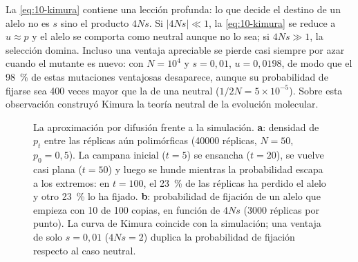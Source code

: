 La \cref{eq:10-kimura} contiene una lección profunda: lo que decide el destino de un alelo no es $s$ sino el producto $4Ns$. Si $|4Ns|\ll1$, la \cref{eq:10-kimura} se reduce a $u\approx p$ y el alelo se comporta como neutral aunque no lo sea; si $4Ns\gg1$, la selección domina. Incluso una ventaja apreciable se pierde casi siempre por azar cuando el mutante es nuevo: con $N=10^4$ y $s=0{,}01$, $u=0{,}0198$, de modo que el \SI{98}{\percent} de estas mutaciones ventajosas desaparece, aunque su probabilidad de fijarse sea 400 veces mayor que la de una neutral ($1/2N=5\times10^{-5}$). Sobre esta observación construyó Kimura la teoría neutral de la evolución molecular.

\begin{figure}[t]
\centering
{}
\caption[Difusión y fijación]{La aproximación por difusión frente a la simulación. \textbf{a}: densidad de $p_t$ entre las réplicas aún polimórficas (\num{40000} réplicas, $N=50$, $p_0=0{,}5$). La campana inicial ($t=5$) se ensancha ($t=20$), se vuelve casi plana ($t=50$) y luego se hunde mientras la probabilidad escapa a los extremos: en $t=100$, el \SI{23}{\percent} de las réplicas ha perdido el alelo y otro \SI{23}{\percent} lo ha fijado. \textbf{b}: probabilidad de fijación de un alelo que empieza con 10 de 100 copias, en función de $4Ns$ (\num{3000} réplicas por punto). La curva de Kimura coincide con la simulación; una ventaja de solo $s=0{,}01$ ($4Ns=2$) duplica la probabilidad de fijación respecto al caso neutral.}
\label{fig:10-difusion}
\end{figure}

